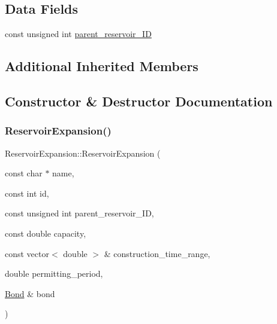 \subsection*{Data Fields}
\begin{DoxyCompactItemize}
\item 
const unsigned int \mbox{\hyperlink{classReservoirExpansion_a56527196174404cfed20b863df2ab0ba_a56527196174404cfed20b863df2ab0ba}{parent\+\_\+reservoir\+\_\+\+ID}}
\end{DoxyCompactItemize}
\subsection*{Additional Inherited Members}


\subsection{Constructor \& Destructor Documentation}
\mbox{\label{classReservoirExpansion_aa742cae4276e97847681dac4f828b5ae_aa742cae4276e97847681dac4f828b5ae}} 
\subsubsection{\texorpdfstring{Reservoir\+Expansion()}{ReservoirExpansion()}\hspace{0.1cm}{\footnotesize\ttfamily [1/2]}}
{\footnotesize\ttfamily Reservoir\+Expansion\+::\+Reservoir\+Expansion (\begin{DoxyParamCaption}\item[{const char $\ast$}]{name,  }\item[{const int}]{id,  }\item[{const unsigned int}]{parent\+\_\+reservoir\+\_\+\+ID,  }\item[{const double}]{capacity,  }\item[{const vector$<$ double $>$ \&}]{construction\+\_\+time\+\_\+range,  }\item[{double}]{permitting\+\_\+period,  }\item[{\mbox{\hyperlink{classBond}{Bond}} \&}]{bond }\end{DoxyParamCaption})}

\mbox{\label{classReservoirExpansion_abc10a6725f7fb85b7478fb6b0b79bd1e_abc10a6725f7fb85b7478fb6b0b79bd1e}} 
